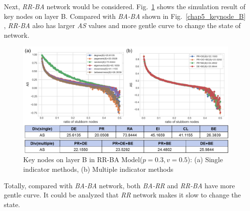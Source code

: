 Next, \textit{RR-BA} network would be considered. Fig.~\ref{chap5_keynode_RR_BA_B} shows the simulation result of key nodes on layer B. Compared with \textit{BA-BA} shown in Fig.~\ref{chap5_keynode_B} , \textit{RR-BA} also has larger \textit{AS} values and more gentle curve to change the state of network.  

\begin{figure}[!htb]
	\centering
	\includegraphics[width=\hsize]{figure/chap5_keynode_RR_BA_B.png}
	\caption{Key nodes on layer B in RR-BA Model($p=0.3, v=0.5$):
		(a) Single indicator methods, (b) Multiple indicator methods}
	\label{chap5_keynode_RR_BA_B}
\end{figure}

Totally, compared with \textit{BA-BA} network, both \textit{BA-RR} and \textit{RR-BA} have more gentle curve. It could be analyzed that \textit{RR} network makes it slow to change the state.  


